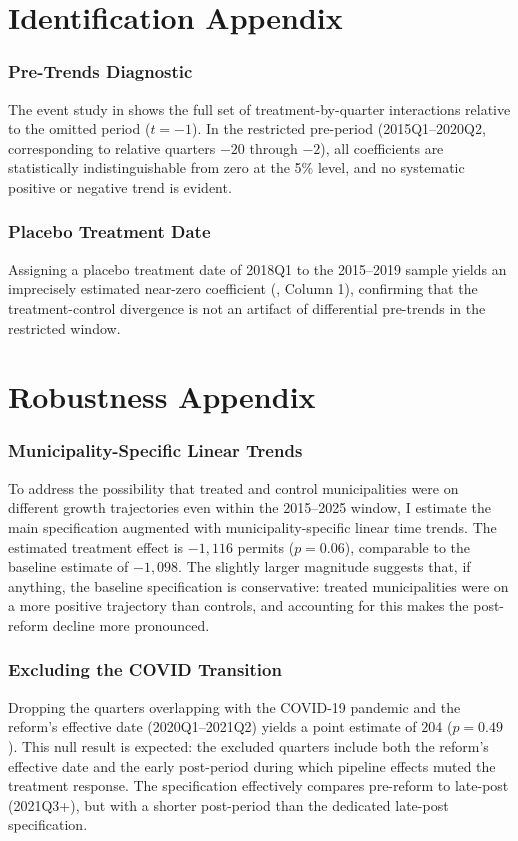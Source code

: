 \documentclass[12pt]{article}
\begin{document}
\section{Identification Appendix}

\subsubsection*{Pre-Trends Diagnostic} The event study in  shows the full set of treatment-by-quarter interactions relative to the omitted period ($t = -1$). In the restricted pre-period (2015Q1--2020Q2, corresponding to relative quarters $-20$ through $-2$), all coefficients are statistically indistinguishable from zero at the 5\% level, and no systematic positive or negative trend is evident.

\subsubsection*{Placebo Treatment Date} Assigning a placebo treatment date of 2018Q1 to the 2015--2019 sample yields an imprecisely estimated near-zero coefficient (, Column 1), confirming that the treatment-control divergence is not an artifact of differential pre-trends in the restricted window.

\section{Robustness Appendix}

\subsubsection*{Municipality-Specific Linear Trends} To address the possibility that treated and control municipalities were on different growth trajectories even within the 2015--2025 window, I estimate the main specification augmented with municipality-specific linear time trends. The estimated treatment effect is $-1,116$ permits ($p = 0.06$), comparable to the baseline estimate of $-1,098$. The slightly larger magnitude suggests that, if anything, the baseline specification is conservative: treated municipalities were on a more positive trajectory than controls, and accounting for this makes the post-reform decline more pronounced.

\subsubsection*{Excluding the COVID Transition} Dropping the quarters overlapping with the COVID-19 pandemic and the reform's effective date (2020Q1--2021Q2) yields a point estimate of $204$ ($p = 0.49$). This null result is expected: the excluded quarters include both the reform's effective date and the early post-period during which pipeline effects muted the treatment response. The specification effectively compares pre-reform to late-post (2021Q3+), but with a shorter post-period than the dedicated late-post specification.
\end{document}
